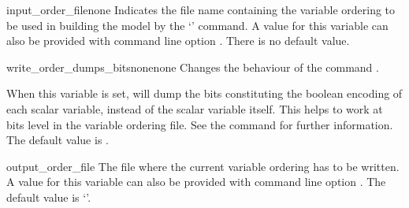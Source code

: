 





\begin{nusmvVar} {input\_order\_file}{}{none}
\label{input_order_file}
Indicates the file name containing the variable ordering to be used in
building the model by the `' command. 
%
A value for this variable can also be provided with command line
option .
%
There is no default value.
\end{nusmvVar}

\begin{nusmvVar} {write\_order\_dumps\_bits}{none}{none}
Changes the behaviour of the command . 

When this variable is set,  will dump the bits
constituting the boolean encoding of each scalar variable, instead of
the scalar variable itself. This helps to work at bits level in the
variable ordering file. See the command  for
further information. The default value is . 
\end{nusmvVar}



\begin{nusmvVar} {output\_order\_file}{}
{}
%
The file where the current variable ordering has to be written. A
value for this variable can also be provided with command line option
.
%
The default value is `'.
%
\end{nusmvVar}

